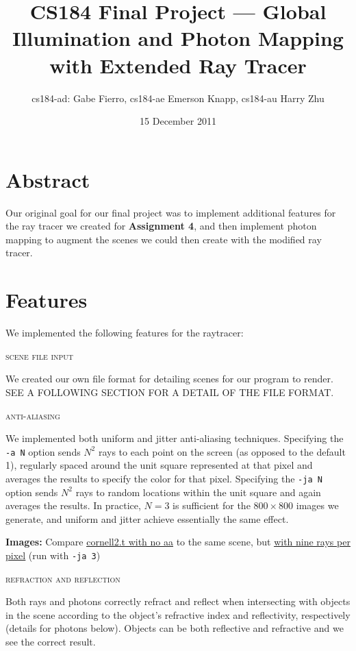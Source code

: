 \documentclass{article}
\title{CS184 Final Project --- Global Illumination and Photon Mapping with Extended Ray Tracer}
\author{cs184-ad: Gabe Fierro, cs184-ae Emerson Knapp, cs184-au Harry Zhu}
\date{15 December 2011}
\begin{document}
\maketitle

\section*{Abstract}

Our original goal for our final project was to implement additional features for the ray tracer we created for {\bf Assignment 4}, and then implement photon mapping to augment the scenes we could then create with the modified ray tracer. 

\tableofcontents

\section{Features} %
\label{sec:features}

We implemented the following features for the raytracer:

\begin{center}\textsc{scene file input}\end{center} 
We created our own file format for detailing scenes for our program to render. SEE A FOLLOWING SECTION FOR A DETAIL OF THE FILE FORMAT.

\begin{center}\textsc{anti-aliasing}\end{center} 
We implemented both uniform and jitter anti-aliasing techniques. Specifying the \verb+-a N+ option sends $N^2$ rays to each point on the screen (as opposed to the default 1), regularly spaced around the unit square represented at that pixel and averages the results to specify the color for that pixel. Specifying the \verb+-ja N+ option sends $N^2$ rays to random locations within the unit square and again averages the results. In practice, $N=3$ is sufficient for the $800\times 800$ images we generate, and uniform and jitter achieve essentially the same effect.

\vspace{3mm}
{\bf Images:} Compare \href{run://images/cornell2_noaa.png}{\underline{cornell2.t with no aa}} to the same scene, but \href{run://images/cornell2_ja3.png}{\underline{with nine rays per pixel}} (run with \verb+-ja 3+)


\begin{center}\textsc{refraction and reflection}\end{center} 
Both rays and photons correctly refract and reflect when intersecting with objects in the scene according to the object's refractive index and reflectivity, respectively (details for photons below). Objects can be both reflective and refractive and we see the correct result. 
\end{document}
